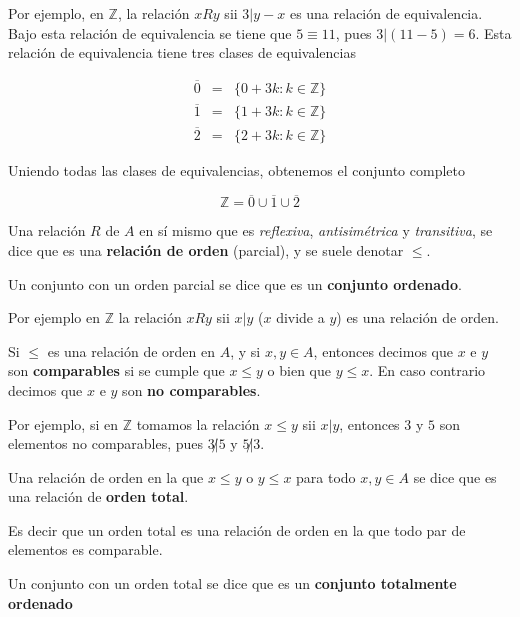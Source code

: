 \begin{example}
Por ejemplo, en $\mathbb{Z}$, la relación $xRy$ sii $3 | y-x$ es una relación de equivalencia.  Bajo esta relación de equivalencia se tiene que $5 \equiv 11$, pues $3 | (11-5) = 6$.  Esta relación de equivalencia tiene tres clases de equivalencias 

\begin{eqnarray*}\overline{0} &=& \{0 + 3k : k \in \mathbb{Z} \} \\
\overline{1} &=& \{1 + 3k : k \in \mathbb{Z} \} \\
\overline{2} &=& \{2 + 3k : k \in \mathbb{Z} \} \end{eqnarray*}

Uniendo todas las clases de equivalencias, obtenemos el conjunto completo

$$ \mathbb{Z} = \overline{0} \cup \overline{1} \cup \overline{2}$$
\end{example}


\begin{definition}
Una relación $R$ de $A$ en sí mismo que es \emph{reflexiva}, \emph{antisimétrica} y \emph{transitiva}, se dice que es una \textbf{relación de orden} \label{orden} (parcial), y se suele denotar $\leq$.

Un conjunto con un orden parcial se dice que es un \textbf{conjunto ordenado}.
\end{definition}

\begin{example}
Por ejemplo en $\mathbb{Z}$ la relación $xRy$ sii $x | y$ ($x$ divide a $y$) es una relación de orden.
\end{example}

\begin{definition}
Si $\leq$ es una relación de orden en $A$, y si $x,y \in A$, entonces decimos que $x$ e $y$ son \textbf{comparables} si se cumple que $x \leq y$ o bien que $y \leq x$.  En caso contrario decimos que $x$ e $y$ son \textbf{no comparables}.
\end{definition}

\begin{example}
Por ejemplo, si en $\mathbb{Z}$ tomamos la relación $x \leq y$ sii $ x | y$, entonces $3$ y $5$ son elementos no comparables, pues $3 \not| 5$ y $5 \not| 3$.
\end{example}

\begin{definition} \label{orden_total}
Una relación de orden en la que $x \leq y$ o $y \leq x$ para todo $x,y \in A$ se dice que es una relación de \textbf{orden total}.

Es decir que un orden total es una relación de orden en la que todo par de elementos es comparable.

Un conjunto con un orden total se dice que es un \textbf{conjunto totalmente ordenado}
\end{definition}

